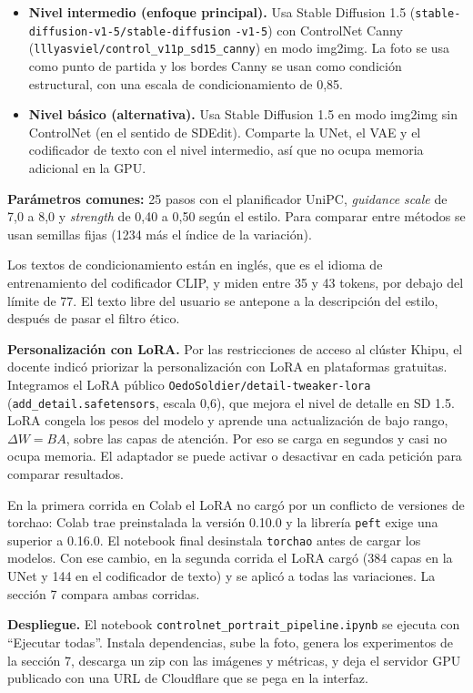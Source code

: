 \documentclass[conference]{IEEEtran}
\begin{document}
\begin{itemize}
\item \textbf{Nivel intermedio (enfoque principal).} Usa Stable Diffusion 1.5 (\texttt{stable-diffusion-v1-5/stable-diffusion} \texttt{-v1-5}) con ControlNet Canny (\texttt{lllyasviel/control\_v11p\_sd15\_canny}) en modo img2img. La foto se usa como punto de partida y los bordes Canny se usan como condición estructural, con una escala de condicionamiento de 0,85.
\item \textbf{Nivel básico (alternativa).} Usa Stable Diffusion 1.5 en modo img2img sin ControlNet (en el sentido de SDEdit). Comparte la UNet, el VAE y el codificador de texto con el nivel intermedio, así que no ocupa memoria adicional en la GPU.
\end{itemize}

\textbf{Parámetros comunes:} 25 pasos con el planificador UniPC, \emph{guidance scale} de 7,0 a 8,0 y \emph{strength} de 0,40 a 0,50 según el estilo. Para comparar entre métodos se usan semillas fijas (1234 más el índice de la variación).

Los textos de condicionamiento están en inglés, que es el idioma de entrenamiento del codificador CLIP, y miden entre 35 y 43 tokens, por debajo del límite de 77. El texto libre del usuario se antepone a la descripción del estilo, después de pasar el filtro ético.

\textbf{Personalización con LoRA.} Por las restricciones de acceso al clúster Khipu, el docente indicó priorizar la personalización con LoRA en plataformas gratuitas. Integramos el LoRA público \texttt{OedoSoldier/detail-tweaker-lora} (\texttt{add\_detail.safetensors}, escala 0,6), que mejora el nivel de detalle en SD 1.5. LoRA congela los pesos del modelo y aprende una actualización de bajo rango, $\Delta W = BA$, sobre las capas de atención. Por eso se carga en segundos y casi no ocupa memoria. El adaptador se puede activar o desactivar en cada petición para comparar resultados.

En la primera corrida en Colab el LoRA no cargó por un conflicto de versiones de torchao: Colab trae preinstalada la versión 0.10.0 y la librería \texttt{peft} exige una superior a 0.16.0. El notebook final desinstala \texttt{torchao} antes de cargar los modelos. Con ese cambio, en la segunda corrida el LoRA cargó (384 capas en la UNet y 144 en el codificador de texto) y se aplicó a todas las variaciones. La sección 7 compara ambas corridas.

\textbf{Despliegue.} El notebook \texttt{controlnet\_portrait\_pipeline.ipynb} se ejecuta con ``Ejecutar todas''. Instala dependencias, sube la foto, genera los experimentos de la sección 7, descarga un zip con las imágenes y métricas, y deja el servidor GPU publicado con una URL de Cloudflare que se pega en la interfaz.
\end{document}
